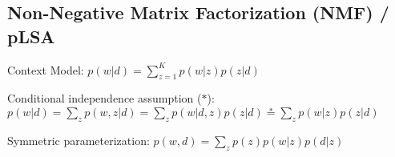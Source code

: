 \documentclass[a4paper, 11pt, landscape]{article}
\begin{document}
\begin{multicols*}{3}



\section{Non-Negative Matrix Factorization (NMF) / pLSA}
\begin{compactdesc}
	\item[Context Model:] $p(w | d) = \sum_{z=1}^K p(w | z) p(z | d)$
	\item[Conditional independence assumption ($*$):] $p(w|d) = \sum_z p(w,z|d) = \sum_z p(w|d,z)p(z|d) \stackrel{*}{=} \sum_z p(w|z)p(z|d)$ 
	\item[Symmetric parameterization:] $p(w, d) = \sum_z p(z)p(w | z) p(d | z)$
\end{compactdesc}


\end{multicols*}
\end{document}
